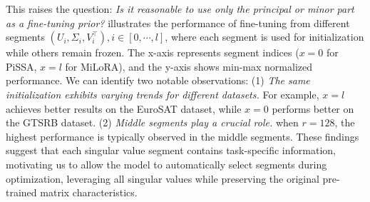This raises the question: \textit{Is it reasonable to use only the principal or minor part as a fine-tuning prior?}  illustrates the performance of fine-tuning from different segments \((U_i, \Sigma_i, V_i^{\top}), i\in [0,\cdots,l]\), where each segment is used for initialization while others remain frozen. The x-axis represents segment indices (\eg $x=0$ for PiSSA, $x=l$ for MiLoRA), and the y-axis shows min-max normalized performance.
We can identify two notable observations: (1) \textit{The same initialization exhibits varying trends for different datasets.} For example, $x=l$ achieves better results on the EuroSAT dataset, while $x=0$ performs better on the GTSRB dataset. (2) \textit{Middle segments play a crucial role.} \eg when $r=128$, the highest performance is typically observed in the middle segments.
These findings suggest that each singular value segment contains task-specific information, motivating us to allow the model to automatically select segments during optimization, leveraging all singular values while preserving the original pre-trained matrix characteristics.






